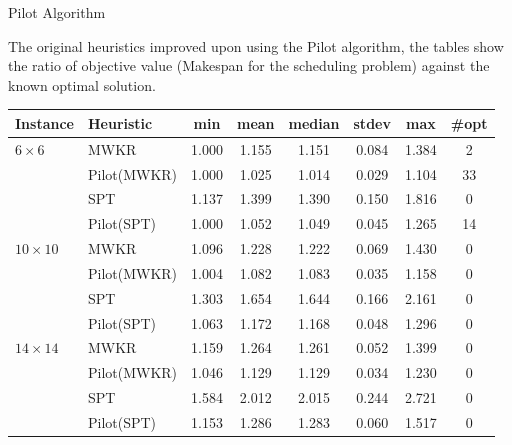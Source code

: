 \documentclass[
	mode=present,
	paper=screen,
	orient=landscape,
	display=slides,
	style=simple
	]{powerdot}
\begin{document}
\begin{slide}{Pilot Algorithm}

The original heuristics improved upon using the Pilot algorithm, the tables show the ratio of objective value 
(Makespan for the scheduling problem) against the known optimal solution.
{\footnotesize
 \begin{center}
\begin{tabular}{l|l|ccccc|c}
Instance & Heuristic & min & mean & median & stdev & max & \#opt\\\hline
$ 6\times  6$ & MWKR & 1.000 & 1.155 & 1.151 & 0.084 & 1.384 & 2 \\
& Pilot(MWKR) & 1.000 & 1.025 & 1.014 & 0.029 & 1.104 & 33 \\\hline
& SPT & 1.137 & 1.399 & 1.390 & 0.150 & 1.816 & 0 \\
& Pilot(SPT) & 1.000 & 1.052 & 1.049 & 0.045 & 1.265 & 14\\\hline
$10\times 10$ & MWKR & 1.096 & 1.228 & 1.222 & 0.069 & 1.430 & 0 \\
& Pilot(MWKR) & 1.004 & 1.082 & 1.083 & 0.035 & 1.158 & 0\\\hline
& SPT & 1.303 & 1.654 & 1.644 & 0.166 & 2.161 & 0 \\
& Pilot(SPT) & 1.063 & 1.172 & 1.168 & 0.048 & 1.296 & 0\\\hline
$14\times 14$ & MWKR & 1.159 & 1.264 & 1.261 & 0.052 & 1.399 & 0 \\
& Pilot(MWKR) & 1.046 & 1.129 & 1.129 & 0.034 & 1.230 & 0\\\hline
& SPT & 1.584 & 2.012 & 2.015 & 0.244 & 2.721 & 0 \\
& Pilot(SPT) & 1.153 & 1.286 & 1.283 & 0.060 & 1.517 & 0\\\hline
\end{tabular}
 \end{center}}



\end{slide}
\end{document}
